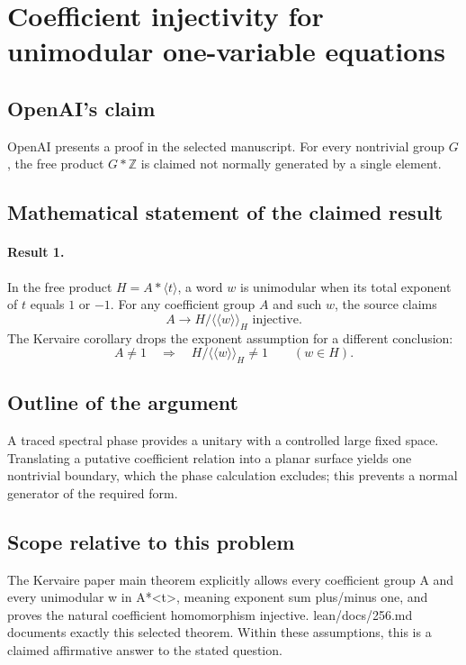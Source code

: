 \documentclass[11pt]{article}
\begin{document}
\section*{Coefficient injectivity for unimodular one-variable equations}

\subsection{OpenAI's claim}
OpenAI presents a proof in the selected manuscript. For every nontrivial group $G$, the free product $G*\mathbb Z$ is claimed not normally generated by a single element.

\subsection{Mathematical statement of the claimed result}
\paragraph{Result 1.} In the free product \(H=A*\langle t\rangle\), a word \(w\) is unimodular when its total exponent of \(t\) equals \(1\) or \(-1\). For any coefficient group \(A\) and such \(w\), the source claims
\[
 A\longrightarrow H/\langle\!\langle w\rangle\!\rangle_H\text{ injective}.
\]
The Kervaire corollary drops the exponent assumption for a different conclusion:
\[
 A\ne1\quad\Longrightarrow\quad
 H/\langle\!\langle w\rangle\!\rangle_H\ne1\qquad(w\in H).
\]

\subsection{Outline of the argument}
A traced spectral phase provides a unitary with a controlled large fixed space. Translating a putative coefficient relation into a planar surface yields one nontrivial boundary, which the phase calculation excludes; this prevents a normal generator of the required form.

\subsection{Scope relative to this problem}
The Kervaire paper main theorem explicitly allows every coefficient group A and every unimodular w in A*<t>, meaning exponent sum plus/minus one, and proves the natural coefficient homomorphism injective. lean/docs/256.md documents exactly this selected theorem. Within these assumptions, this is a claimed affirmative answer to the stated question.
\end{document}
